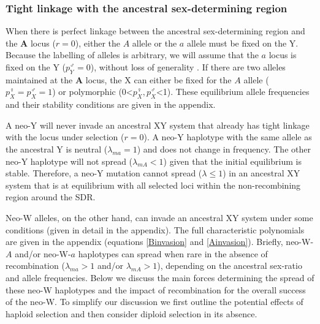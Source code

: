 \documentclass[12pt]{article}
\begin{document}
\subsubsection*{Tight linkage with the ancestral sex-determining region}

When there is perfect linkage between the ancestral sex-determining region and the \textbf{A} locus ($r=0$), either the $A$ allele or the $a$ allele must be fixed on the Y. 
Because the labelling of alleles is arbitrary, we will assume that the $a$ locus is fixed on the Y ($p^\male_Y=0$), without loss of generality . 
If there are two alleles maintained at the \textbf{A} locus, the X can either be fixed for the $A$ allele ($p^\female_X=p^\male_X=1$) or polymorphic (0<$p^\female_X, p^\male_X$<1). 
These equilibrium allele frequencies and their stability conditions are given in the appendix.

A neo-Y will never invade an ancestral XY system that already has tight linkage with the locus under selection ($r=0$). 
A neo-Y haplotype with the same allele as the ancestral Y is neutral ($\lambda_{ma}=1$) and does not change in frequency.
The other neo-Y haplotype will not spread ($\lambda_{mA}<1$) given that the initial equilibrium is stable. 
Therefore, a neo-Y mutation cannot spread ($\lambda \leq 1$) in an ancestral XY system that is at equilibrium with all selected loci within the non-recombining region around the SDR.

Neo-W alleles, on the other hand, can invade an ancestral XY system under some conditions (given in detail in the appendix). 
The full characteristic polynomials are given in the appendix (equations \ref{Binvasion} and \ref{Ainvasion}).
Briefly, neo-W-$A$ and/or neo-W-$a$ haplotypes can spread when rare in the absence of recombination ($\lambda_{ma}>1$ and/or $\lambda_{mA}>1$), depending on the ancestral sex-ratio and allele frequencies. 
Below we discuss the main forces determining the spread of these neo-W haplotypes and the impact of recombination for the overall success of the neo-W.
To simplify our discussion we first outline the potential effects of haploid selection and then consider diploid selection in its absence.
\end{document}
